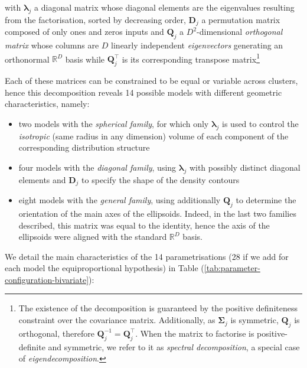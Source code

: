 with \(\boldsymbol{\lambda}_j\) a diagonal matrix whose diagonal elements are the eigenvalues resulting from the factorisation, sorted by decreasing order, \(\boldsymbol{D}_j\) a permutation matrix composed of only ones and zeros inputs and \(\boldsymbol{Q}_j\) a \(D^2\)-dimensional \emph{orthogonal matrix} whose
columns are \(D\) linearly independent \emph{eigenvectors} generating an orthonormal \(\mathbb{R}^D\) basis while \(\boldsymbol{Q}_j^\top\) is its corresponding transpose matrix\footnote{The existence of the decomposition is guaranteed by the positive definiteness constraint over the covariance matrix. Additionally, as
  \(\boldsymbol{\Sigma}_j\) is symmetric, \(\boldsymbol{Q}_j\) is orthogonal, therefore \(\boldsymbol{Q}_j^{-1}=\boldsymbol{Q}_j^\top\). When the matrix to factorise is positive-definite and symmetric, we refer to it as \emph{spectral decomposition}, a special case of \emph{eigendecomposition}.}

Each of these matrices can be constrained to be equal or variable across clusters, hence this decomposition reveals 14 possible models with different geometric characteristics, namely:

\begin{itemize}
\item
  two models with the \emph{spherical family}, for which only \(\boldsymbol{\lambda}_j\) is used to control the \emph{isotropic} (same radius in any dimension) volume of each component of the corresponding distribution structure
\item
  four models with the \emph{diagonal family}, using \(\boldsymbol{\lambda}_j\) with possibly distinct diagonal elements and \(\boldsymbol{D}_j\) to specify the shape of the density contours
\item
  eight models with the \emph{general family}, using additionally \(\boldsymbol{Q}_j\) to determine the orientation of the main axes of the ellipsoids. Indeed, in the last two families described, this matrix was equal to the identity, hence the axis of the ellipsoids were aligned with the standard \(\mathbb{R}^D\) basis.
\end{itemize}

We detail the main characteristics of the 14 parametrisations (28 if we add for each model the equiproportional hypothesis) in Table (\ref{tab:parameter-configuration-bivariate}):

